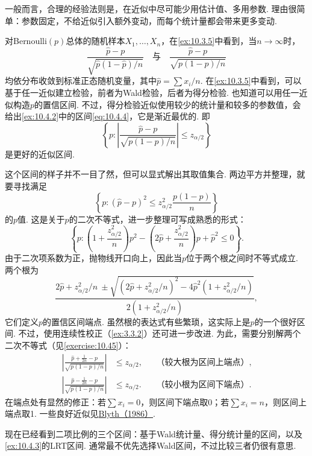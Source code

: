一般而言，合理的经验法则是，在近似中尽可能少用估计值、多用参数. 理由很简单：参数固定，不给近似引入额外变动，而每个统计量都会带来更多变动.

\begin{example}[再论二项得分区间]\label{ex:10.4.6}
对Bernoulli$(p)$总体的随机样本$X_1,\ldots,X_n$，在\autoref{ex:10.3.5}中看到，当$n\to\infty$时，
$$\frac{\hat p-p}{\sqrt{\hat p(1-\hat p)/n}}\quad\text{与}\quad\frac{\hat p-p}{\sqrt{p(1-p)/n}}$$
均依分布收敛到标准正态随机变量，其中$\hat p=\sum x_i/n$. 在\autoref{ex:10.3.5}中看到，可以基于任一近似建立检验，前者为Wald检验，后者为得分检验. 也知道可以用任一近似构造$p$的置信区间. 不过，得分检验近似使用较少的统计量和较多的参数值，会给出\autoref{ex:10.4.2}中的区间\eqref{eq:10.4.4}，它是渐近最优的. 即
$$\left\{p:\left|\frac{\hat p-p}{\sqrt{p(1-p)/n}}\right|\leq z_{\alpha/2}\right\}$$
是更好的近似区间.

这个区间的样子并不一目了然，但可以显式解出其取值集合. 两边平方并整理，就要寻找满足
$$\left\{p:(\hat p-p)^2\leq z_{\alpha/2}^2\frac{p(1-p)}n\right\}$$
的$p$值. 这是关于$p$的二次不等式，进一步整理可写成熟悉的形式：
$$\left\{p:\left(1+\frac{z_{\alpha/2}^2}n\right)p^2-\left(2\hat p+\frac{z_{\alpha/2}^2}n\right)p+\hat p^2\leq0\right\}.$$
由于二次项系数为正，抛物线开口向上，因此当$p$位于两个根之间时不等式成立. 两个根为
\begin{equation}\label{eq:10.4.7}
\frac{2\hat p+z_{\alpha/2}^2/n\ \pm\sqrt{(2\hat p+z_{\alpha/2}^2/n)^2-4\hat p^2(1+z_{\alpha/2}^2/n)}}{2(1+z_{\alpha/2}^2/n)},
\end{equation}
它们定义$p$的置信区间端点. 虽然根的表达式有些繁琐，这实际上是$p$的一个很好区间. 不过，使用连续性校正（\autoref{ex:3.3.2}）还可进一步改进. 为此，需要分别解两个二次不等式（见\autoref{exercise:10.45}）：
$$\begin{aligned}
\left|\frac{\hat p+\frac1{2n}-p}{\sqrt{p(1-p)/n}}\right|&\leq z_{\alpha/2},&&\text{（较大根为区间上端点）},\\
\left|\frac{\hat p-\frac1{2n}-p}{\sqrt{p(1-p)/n}}\right|&\leq z_{\alpha/2}.&&\text{（较小根为区间下端点）}.
\end{aligned}$$
在端点处有显然的修正：若$\sum x_i=0$，则区间下端点取0；若$\sum x_i=n$，则区间上端点取1. 一些良好近似见\hyperref[bib:source39]{Blyth（1986）}.
\end{example}

现在已经看到二项比例的三个区间：基于Wald统计量、得分统计量的区间，以及\autoref{ex:10.4.3}的LRT区间. 通常最不优先选择Wald区间，不过比较三者仍很有意思.

